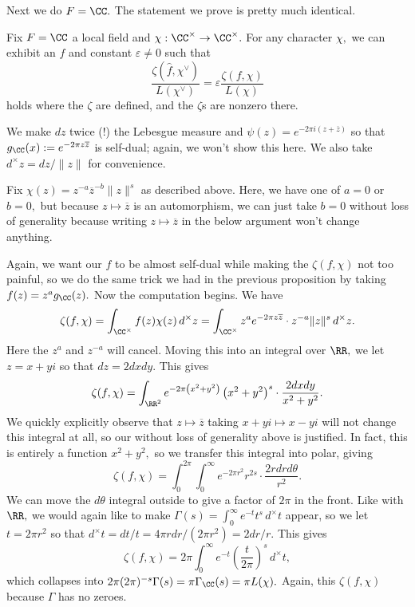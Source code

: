 Next we do $F=\CC.$ The statement we prove is pretty much identical.
\begin{proposition}
    Fix $F=\CC$ a local field and $\chi:\CC^\times\to\CC^\times.$ For any character $\chi,$ we can exhibit an $f$ and constant $\varepsilon\ne0$ such that
    \[\frac{\zeta(\hat f,\chi^\vee)}{L(\chi^\vee)}=\varepsilon\frac{\zeta(f,\chi)}{L(\chi)}\]
    holds where the $\zeta$ are defined, and the $\zeta$s are nonzero there.
\end{proposition}
We make $dz$ twice (!) the Lebesgue measure and $\psi(z)=e^{-2\pi i(z+\overline z)}$ so that $g_\CC(x):=e^{-2\pi z\overline z}$ is self-dual; again, we won't show this here. We also take $d^\times z=dz/\lVert z\rVert$ for convenience.

Fix $\chi(z)=z^{-a}\overline z^{-b}\lVert z\rVert^s$ as described above. Here, we have one of $a=0$ or $b=0,$ but because $z\mapsto\overline z$ is an automorphism, we can just take $b=0$ without loss of generality because writing $z\mapsto\overline z$ in the below argument won't change anything.

Again, we want our $f$ to be almost self-dual while making the $\zeta(f,\chi)$ not too painful, so we do the same trick we had in the previous proposition by taking $f(z)=z^ag_\CC(z).$ Now the computation begins. We have
\[\zeta(f,\chi)=\int_{\CC^\times}f(z)\chi(z)\,d^\times z=\int_{\CC^\times}z^ae^{-2\pi z\overline z}\cdot z^{-a}\lVert z\rVert^s\,d^\times z.\]
Here the $z^a$ and $z^{-a}$ will cancel. Moving this into an integral over $\RR,$ we let $z=x+yi$ so that $dz=2dxdy.$ This gives
\[\zeta(f,\chi)=\int_{\RR^2}e^{-2\pi\left(x^2+y^2\right)}\left(x^2+y^2\right)^s\cdot\frac{2dxdy}{x^2+y^2}.\]
We quickly explicitly observe that $z\mapsto\overline z$ taking $x+yi\mapsto x-yi$ will not change this integral at all, so our without loss of generality above is justified. In fact, this is entirely a function $x^2+y^2,$ so we transfer this integral into polar, giving
\[\zeta(f,\chi)=\int_0^{2\pi}\int_0^\infty e^{-2\pi r^2}r^{2s}\cdot\frac{2rdrd\theta}{r^2}.\]
We can move the $d\theta$ integral outside to give a factor of $2\pi$ in the front. Like with $\RR,$ we would again like to make $\Gamma(s)=\int_0^\infty e^{-t}t^s\,d^\times t$ appear, so we let $t=2\pi r^2$ so that $d^\times t=dt/t=4\pi rdr/\left(2\pi r^2\right)=2dr/r.$ This gives
\[\zeta(f,\chi)=2\pi\int_0^\infty e^{-t}\left(\frac t{2\pi}\right)^s\,d^\times t,\]
which collapses into $2\pi(2\pi)^{-s}\Gamma(s)=\pi\Gamma_\CC(s)=\pi L(\chi).$ Again, this $\zeta(f,\chi)$ because $\Gamma$ has no zeroes.

